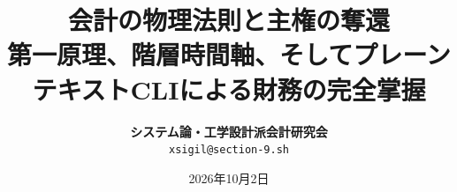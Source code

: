 \documentclass[11pt, a4paper]{report}
\begin{document}
\title{\Huge \textbf{会計の物理法則と主権の奪還}\\[4mm]
\Large 第一原理、階層時間軸、そしてプレーンテキストCLIによる財務の完全掌握}
\author{\textbf{システム論・工学設計派会計研究会} \\ \texttt{xsigil@section-9.sh}}
\date{2026年10月2日}
\maketitle
\tableofcontents
\newpage










\end{document}
